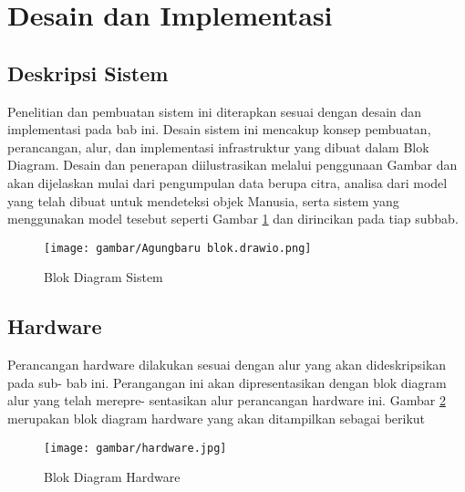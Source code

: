 \section{Desain dan Implementasi}
\label{sec:desaindanimplementasi}

\subsection{Deskripsi Sistem}
\label{sec:deskripsisistem}
Penelitian dan pembuatan sistem ini diterapkan sesuai dengan desain dan implementasi pada bab ini. Desain sistem ini mencakup konsep pembuatan, perancangan, alur, dan implementasi infrastruktur yang dibuat dalam Blok Diagram. Desain dan penerapan diilustrasikan melalui penggunaan Gambar dan akan dijelaskan mulai dari pengumpulan data berupa citra, analisa dari model yang telah dibuat untuk mendeteksi objek Manusia, serta sistem yang menggunakan model tesebut seperti Gambar \ref{fig:Blok Diagram Sistem yang digunakan.} dan dirincikan pada tiap subbab.

\begin{figure}[H]
  \centering

  \texttt{[image: gambar/Agungbaru blok.drawio.png]}

  \caption{Blok Diagram Sistem}
  \label{fig:Blok Diagram Sistem yang digunakan.}
\end{figure}

\subsection{Hardware}
Perancangan hardware dilakukan sesuai dengan alur yang akan dideskripsikan pada sub- bab ini. Perangangan ini akan dipresentasikan dengan blok diagram alur yang telah merepre- sentasikan alur perancangan hardware ini. Gambar \ref{fig:Blok Hardware sistem.} merupakan blok diagram hardware yang akan ditampilkan sebagai berikut
\begin{figure}[H]
  \centering

  \texttt{[image: gambar/hardware.jpg]}

  \caption{Blok Diagram Hardware}
  \label{fig:Blok Hardware sistem.}
\end{figure}

